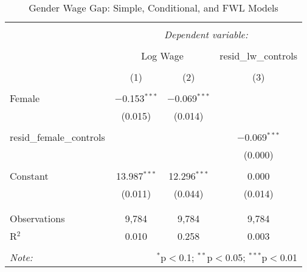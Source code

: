 
\begin{table}[!htbp] \centering 
  \caption{Gender Wage Gap: Simple, Conditional, and FWL Models} 
  \label{} 
\begin{tabular}{@{\extracolsep{5pt}}lccc} 
\\[-1.8ex]\hline 
\hline \\[-1.8ex] 
 & \multicolumn{3}{c}{\textit{Dependent variable:}} \\ 
\cline{2-4} 
\\[-1.8ex] & \multicolumn{2}{c}{Log Wage} & resid\_lw\_controls \\ 
\\[-1.8ex] & (1) & (2) & (3)\\ 
\hline \\[-1.8ex] 
 Female & $-$0.153$^{***}$ & $-$0.069$^{***}$ &  \\ 
  & (0.015) & (0.014) &  \\ 
  & & & \\ 
 resid\_female\_controls &  &  & $-$0.069$^{***}$ \\ 
  &  &  & (0.000) \\ 
  & & & \\ 
 Constant & 13.987$^{***}$ & 12.296$^{***}$ & 0.000 \\ 
  & (0.011) & (0.044) & (0.014) \\ 
  & & & \\ 
\hline \\[-1.8ex] 
Observations & 9,784 & 9,784 & 9,784 \\ 
R$^{2}$ & 0.010 & 0.258 & 0.003 \\ 
\hline 
\hline \\[-1.8ex] 
\textit{Note:}  & \multicolumn{3}{r}{$^{*}$p$<$0.1; $^{**}$p$<$0.05; $^{***}$p$<$0.01} \\ 
\end{tabular} 
\end{table} 
